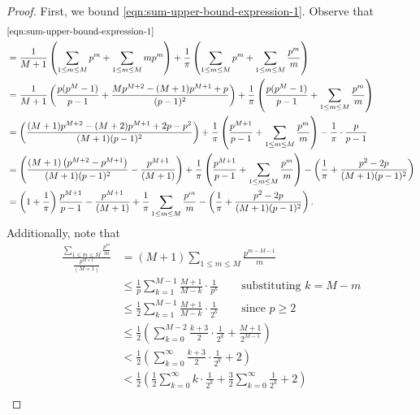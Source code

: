 \documentclass[10pt,a4paper]{amsart}
\begin{document}
\begin{proof}
First, we bound \eqref{eqn:sum-upper-bound-expression-1}. Observe that
\begin{align}
    & \eqref{eqn:sum-upper-bound-expression-1} \\
    &= \frac{1}{M + 1} \left(  \sum_{1 \leq m \leq M} p^m + \sum_{1 \leq m \leq M} mp^m\right) + \frac{1}{\pi} \left( \sum_{1 \leq m \leq M} p^m  + \sum_{1 \leq m \leq M} \frac{p^m}{m} \right)\\
    &= \frac{1}{M + 1} \left( \frac{p(p^M - 1)}{p -1} + \frac{M p^{M+ 2} - (M + 1)p^{M + 1} + p}{(p - 1)^2} \right) + \frac{1}{\pi} \left(\frac{p(p^M - 1)}{p -1}  + \sum_{1 \leq m \leq M} \frac{p^m}{m} \right)\\
    &=  \left(  \frac{(M + 1) p^{M+ 2} - (M + 2)p^{M + 1} + 2p - p^2}{(M + 1)(p - 1)^2} \right) + \frac{1}{\pi} \left( \frac{p^{M + 1}}{p - 1}  + \sum_{1 \leq m \leq M} \frac{p^m}{m} \right) - \frac{1}{\pi} \cdot \frac{p}{p - 1}\\
    &=  \left(  \frac{(M + 1) \left( p^{M + 2} - p^{M + 1} \right)}{(M + 1)(p - 1)^2} - \frac{p^{M + 1}}{(M + 1)} \right) + \frac{1}{\pi} \left(\frac{p^{M + 1}}{p - 1} + \sum_{1 \leq m \leq M} \frac{p^m}{m} \right) - \left( \frac{1}{\pi} + \frac{p^2 - 2p}{(M + 1)(p - 1)^2} \right)\\
    &=  \left( 1 + \frac{1}{\pi} \right) \frac{ p^{M + 1} }{p - 1} - \frac{p^{M + 1}}{(M + 1)}  + \frac{1}{\pi}  \sum_{1 \leq m \leq M} \frac{p^m}{m} - \left( \frac{1}{\pi} + \frac{p^2 - 2p}{(M + 1)(p - 1)^2} \right). \label{eqn:simplified---sum-upper-bound-expression-1}
\end{align}
Additionally, note that
\begin{align*}
    \frac{ \sum_{1 \leq m \leq M} \frac{p^m}{m}}{\frac{p^{M + 1}}{(M + 1)}} &= (M + 1) \sum_{1 \leq m \leq M} \frac{p^{m - M - 1}}{m} \\
    &\leq \frac{1}{p} \sum_{k = 1}^{M - 1} \frac{M + 1}{M - k} \cdot  \frac{1}{p^k} \qquad  \text{substituting $k = M - m$} \\
    &\leq \frac{1}{2} \sum_{k = 1}^{M - 1} \frac{M + 1}{M - k} \cdot  \frac{1}{2^k} \qquad \text{since $p \geq 2$} \\
    &\leq \frac{1}{2} \left( \sum_{k = 0}^{M - 2} \frac{k + 3}{2} \cdot \frac{1}{2^k}  +  \frac{M + 1}{2^{M - 1}} \right)\\
    &< \frac{1}{2} \left( \sum_{k = 0}^{\infty} \frac{k + 3}{2} \cdot \frac{1}{2^k} +  2 \right) \\
    &< \frac{1}{2} \left( \frac{1}{2}\sum_{k = 0}^{\infty} k \cdot \frac{1}{2^k} + \frac{3}{2} \sum_{k = 0}^{\infty} \frac{1}{2^k} +  2 \right) \\

\end{align*}
\end{proof}
\end{document}
